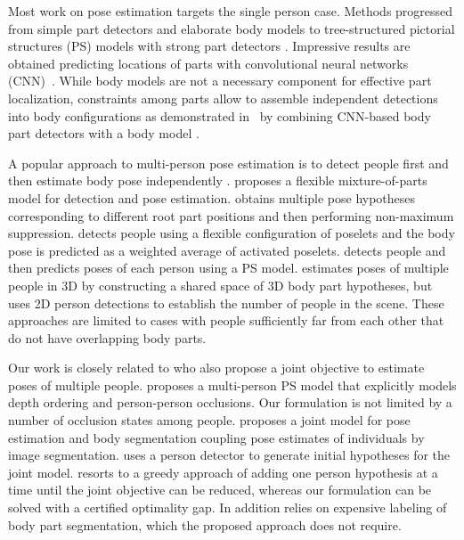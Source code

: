 Most work on pose estimation targets the 
single person case. Methods progressed from
simple part detectors and elaborate body models
\cite{Ren:2005:RHB,Ramanan:2006:LPI,Jiang:2008:GPE} to tree-structured
pictorial structures (PS) models with strong
part detectors
\cite{pishchulin13iccv,yang12pami,chen14nips,sapp13cvpr}. 
Impressive results are obtained predicting locations
of parts with convolutional neural networks (CNN)~\cite{Toshev:2014:DHP,Tompson:2015:EOL}. 
While body models are not a necessary component for effective
part localization, constraints among parts allow to assemble
independent detections into body configurations as 
demonstrated in~\cite{chen14nips} by combining CNN-based body part
detectors with a body model \cite{yang12pami}.

A popular approach to multi-person pose estimation is to detect people first and then estimate body
pose independently 
\cite{Sun:2011:APM,pishchulin12cvpr,yang12pami,Gkioxari:2014:UKP}. \cite{yang12pami} proposes a
flexible mixture-of-parts model for detection and pose estimation. 
\cite{yang12pami} obtains multiple pose hypotheses 
corresponding to
different root part positions %
and then performing non-maximum suppression.
\cite{Gkioxari:2014:UKP} detects people using a flexible configuration of
poselets and  
the body pose is predicted as a weighted average 
of activated poselets. \cite{pishchulin12cvpr} detects people and then predicts poses of each
person using a PS model. \cite{Belagiannis:2014:3DP} estimates poses of multiple
people in 3D by constructing a shared space of 3D body part hypotheses, but uses 2D person detections
to establish the number of people in the scene. 
These approaches are limited to cases with people sufficiently far from each other that do not have
overlapping body parts.

Our work is closely related to \cite{eichner10eccv,Ladicky:2013:HPE}
who also propose a joint objective to estimate poses of multiple
people. \cite{eichner10eccv} proposes a multi-person PS model that
explicitly models depth ordering and person-person occlusions. Our
formulation is not limited by a number of occlusion states among
people. \cite{Ladicky:2013:HPE} proposes a joint model for pose
estimation and body segmentation coupling pose estimates of
individuals by image segmentation.
\cite{eichner10eccv,Ladicky:2013:HPE} uses a person detector
to generate initial hypotheses for the joint
model. \cite{Ladicky:2013:HPE} resorts to a greedy approach of adding
one person hypothesis at a time until the joint objective can be
reduced, whereas our formulation can be solved with a certified optimality gap. In
addition \cite{Ladicky:2013:HPE} relies on expensive labeling of body
part segmentation, which the proposed approach does not require.

